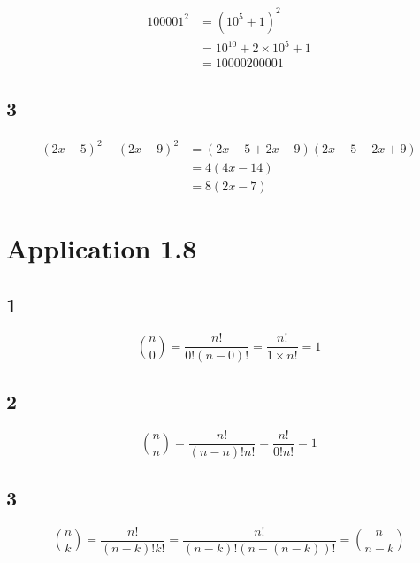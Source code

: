 \documentclass[12pt]{smfbook}
\begin{document}
\begin{equation*}
	\begin{split}
		100001^2 &= (10^5 + 1)^2 \\
		&= 10^{10} + 2 \times 10^5 + 1 \\
		&= 10000200001
	\end{split}
\end{equation*}



\subsection*{3}

\begin{equation*}
	\begin{split}
		(2x-5)^2 - (2x - 9)^2 &= (2x-5+2x-9)(2x-5-2x+9) \\
		&= 4(4x-14) \\
		&= 8(2x-7)
	\end{split}
\end{equation*}



\section*{Application 1.8}

\subsection*{1}

\begin{displaymath}
	\binom{n}{0}= \frac{n!}{0!(n-0)!}= \frac{n!}{1 \times n!}=1
\end{displaymath}

\subsection*{2}
\begin{displaymath}
	\binom{n}{n}= \frac{n!}{(n-n)!n!}= \frac{n!}{0!n!}=1
\end{displaymath}


\subsection*{3}
\begin{displaymath}
	\binom{n}{k}= \frac{n!}{(n-k)!k!}= \frac{n!}{(n-k)!(n-(n-k))!}=\binom{n}{n-k}
\end{displaymath}
\end{document}
